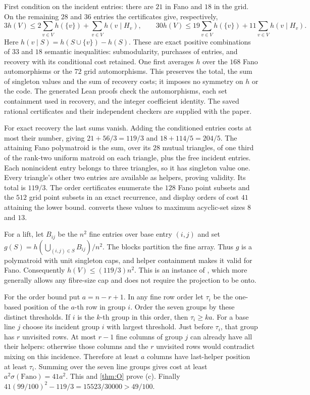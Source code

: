 \begin{outline}
First condition on the incident entries: there are $21$ in Fano and $18$ in the grid. On the remaining $28$ and
$36$ entries the certificates give, respectively,
\begin{equation}\label{eq:paid-residual}
 3h(V)\le2\sum_{v\in V}h(\{v\})+\sum_{v\in V}h(v\mid H_v),\qquad
 30h(V)\le19\sum_{v\in V}h(\{v\})+11\sum_{v\in V}h(v\mid H_v).
\end{equation}
Here $h(v\mid S)=h(S\cup\{v\})-h(S)$. These are exact positive combinations of $33$ and $18$ semantic
inequalities: submodularity, purchases of entries, and recovery with its conditional cost retained. One first
averages $h$ over the $168$ Fano automorphisms or the $72$ grid automorphisms. This preserves the total, the sum
of singleton values and the sum of recovery costs; it imposes no symmetry on $h$ or the code. The generated Lean
proofs check the automorphisms, each set containment used in recovery, and the integer coefficient identity.
The saved rational certificates and their independent checkers are supplied with the paper.

For exact recovery the last sums vanish. Adding the conditioned entries costs at most their number, giving
$21+56/3=119/3$ and $18+114/5=204/5$. The attaining Fano polymatroid is the sum, over its $28$ mutual triangles,
of one third of the rank-two uniform matroid on each triangle, plus the free incident entries. Each nonincident
entry belongs to three triangles, so it has singleton value one. Every triangle's other two entries are available
as helpers, proving validity. Its total is $119/3$. The order certificates enumerate the $128$ Fano point subsets
and the $512$ grid point subsets in an exact recurrence, and display orders of cost $41$ attaining the lower bound.
 converts these values to maximum acyclic-set sizes $8$ and $13$.

For a lift, let $B_{ij}$ be the $n^2$ fine entries over base entry $(i,j)$ and set
$g(S)=h(\bigcup_{(i,j)\in S}B_{ij})/n^2$. The blocks partition the fine array. Thus $g$ is a polymatroid with
unit singleton caps, and helper containment makes it valid for Fano. Consequently $h(V)\le(119/3)n^2$.
This is an instance of , which more generally allows any fibre-size
cap and does not require the projection to be onto.

For the order bound put $a=n-r+1$. In any fine row order let $\tau_i$ be the one-based position of the $a$-th row
in group $i$. Order the seven groups by these distinct thresholds. If $i$ is the $k$-th group in this order, then
$\tau_i\ge ka$. For a base line $j$ choose its incident group $i$ with largest threshold. Just before $\tau_i$,
that group has $r$ unvisited rows. At most $r-1$ fine columns of group $j$ can already have all their helpers:
otherwise those columns and the $r$ unvisited rows would contradict mixing on this incidence. Therefore at least
$a$ columns have last-helper position at least $\tau_i$. Summing over the seven line groups gives cost at least
$a^2\sigma(\text{Fano})=41a^2$. This and \cref{thm:O} prove (c). Finally
$41(99/100)^2-119/3=15523/30000>49/100$.
\end{outline}


